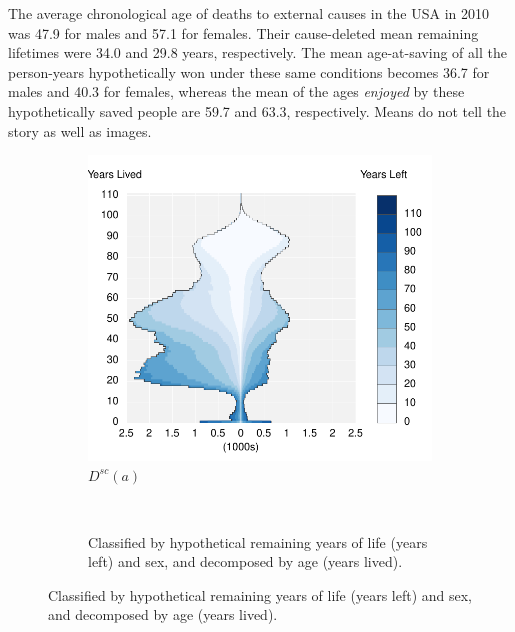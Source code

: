 \documentclass{article}
\begin{document}
 The average chronological age of deaths to external causes in the USA in 2010
 was 47.9 for males and 57.1 for females. Their cause-deleted mean remaining
 lifetimes were 34.0 and 29.8 years, respectively. The mean age-at-saving of all
 the person-years hypothetically won under these same conditions becomes 36.7
 for males and 40.3 for females, whereas the mean of the ages \textit{enjoyed}
 by these hypothetically saved people are 59.7 and 63.3, respectively. Means do
 not tell the story as well as images. 

\begin{figure}
\centering
\caption{USA, 2010 Deaths from external causes}
\label{fig:3}
\begin{subfigure}[b]{.48\linewidth}
\centering
	\caption{Classified by age (years lived) and sex, and decomposed
by hypothetical remaining years of life (years left).}
	\label{fig:Dayc}
	\includegraphics[scale=.55]{Figures/Deathsxy10USAExternal.pdf}	
	\caption*{$D^{sc}(a)$}
\end{subfigure}
~
\begin{subfigure}[b]{.48\linewidth}
\centering
    \caption{Classified by hypothetical remaining years of life
(years left) and sex, and decomposed by age (years lived).}
	\label{fig:Dyac}

\end{subfigure}
\end{figure}
\end{document}
